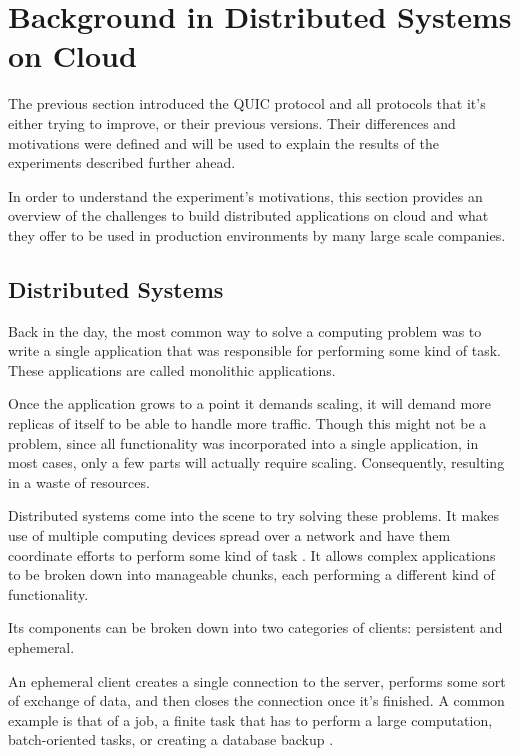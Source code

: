 \section{Background in Distributed Systems on Cloud}

The previous section introduced the QUIC protocol and all protocols that it’s either trying to improve, or their previous versions. Their differences and motivations were defined and will be used to explain the results of the experiments described further ahead.

In order to understand the experiment's motivations, this section provides an overview of the challenges to build distributed applications on cloud and what they offer to be used in production environments by many large scale companies.

\subsection{Distributed Systems}

Back in the day, the most common way to solve a computing problem was to write a single application that was responsible for performing some kind of task. These applications are called monolithic applications.

Once the application grows to a point it demands scaling, it will demand more replicas of itself to be able to handle more traffic. Though this might not be a problem, since all functionality was incorporated into a single application, in most cases, only a few parts will actually require scaling. Consequently, resulting in a waste of resources.

Distributed systems come into the scene to try solving these problems. It makes use of multiple computing devices spread over a network and have them coordinate efforts to perform some kind of task \cite{distributed_systems_principles}. It allows complex applications to be broken down into manageable chunks, each performing a different kind of functionality.

Its components can be broken down into two categories of clients: persistent and ephemeral.

An ephemeral client creates a single connection to the server, performs some sort of exchange of data, and then closes the connection once it’s finished. A common example is that of a job, a finite task that has to perform a large computation, batch-oriented tasks, or creating a database backup \cite{os_distributed_systems}.

